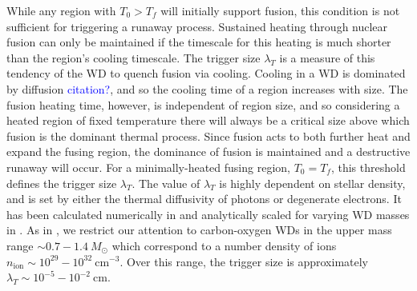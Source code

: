 \documentclass[twocolumn,showpacs,preprintnumbers,amsmath,amssymb,prd]{revtex4}
\newcommand{\cm}{\text{cm}}
\begin{document}
While any region with $T_0 > T_f$ will initially support fusion, this condition is not sufficient for triggering a runaway process.
Sustained heating through nuclear fusion can only be maintained if the timescale for this heating is much shorter than the region's cooling timescale.
The trigger size $\lambda_T$ is a measure of this tendency of the WD to quench fusion via cooling.
Cooling in a WD is dominated by diffusion \textcolor{blue}{citation?}, and so the cooling time of a region increases with size. 
The fusion heating time, however, is independent of region size, and so considering a heated region of fixed temperature there will always be a critical size above which fusion is the dominant thermal process.
Since fusion acts to both further heat and expand the fusing region, the dominance of fusion is maintained and a destructive runaway will occur.
For a minimally-heated fusing region, $T_0=T_f$, this threshold defines the trigger size $\lambda_T$.
The value of $\lambda_T$ is highly dependent on stellar density, and is set by either the thermal diffusivity of photons or degenerate electrons.
It has been calculated numerically in \cite{Woosley} and analytically scaled for varying WD masses in \cite{Graham:2015apa}.
As in \cite{Graham:2015apa}, we restrict our attention to carbon-oxygen WDs in the upper mass range $\sim 0.7 - 1.4 ~M_{\odot}$ which correspond to a number density of ions $n_\text{ion} \sim 10^{29} - 10^{32} ~\cm^{-3}$.
Over this range, the trigger size is approximately $\lambda_T \sim 10^{-5} - 10^{-2} ~\text{cm}$.
\end{document}

